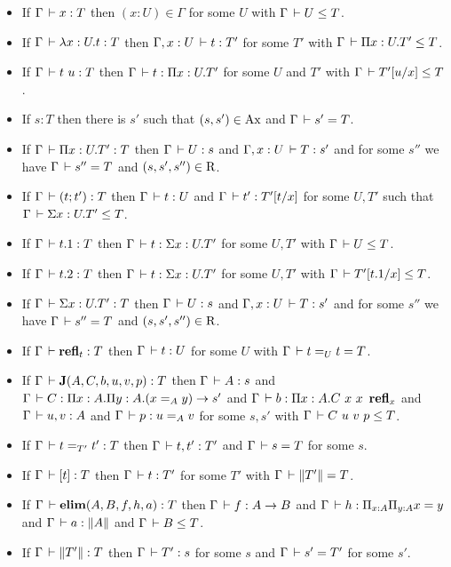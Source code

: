 \documentclass[a4paper,english]{lipics-utf8x}
\begin{document}
  \begin{lemma}[Inversion]
    \label{lem:inversion}
    \leavevmode
    \begin{itemize}
      \item If $\Gamma \,\vdash x : T$ then $(x:U) \in \Gamma$ for some
      $U$ with $\Gamma \,\vdash U \le T$.
      \item If $\Gamma \,\vdash \lambda x:U.t : T$ then $\Gamma, x:U \,\vdash t : T'$
      for some $T'$ with $\Gamma \,\vdash \Pi x:U.T' \le T$.
      \item If $\Gamma \,\vdash t\ u : T$ then $\Gamma \,\vdash t : \Pi x:U.T'$
      for some $U$ and $T'$ with $\Gamma \,\vdash T'[u/x] \le T$.
      \item If $s : T$ then there is $s'$ such that $(s,s') \in \operatorname{Ax}$
      and $\Gamma \,\vdash s' = T$.
      \item If $\Gamma \,\vdash \Pi x:U.T' : T$ then $\Gamma \,\vdash U : s$
      and $\Gamma, x:U \,\vdash T : s'$ and for some $s''$ we have
      $\Gamma \,\vdash s'' = T$ and $(s,s',s'') \in \operatorname{R}$.
      \item If $\Gamma \,\vdash (t ; t') : T$ then $\Gamma \,\vdash t : U$ and
      $\Gamma \,\vdash t' : T'[t/x]$ for some $U,T'$ such that
      $\Gamma \,\vdash \Sigma x:U.T' \le T$.
      \item If $\Gamma \,\vdash t.1 : T$ then $\Gamma \,\vdash t : \Sigma x:U.T'$
      for some $U,T'$ with $\Gamma \,\vdash U \le T$.
      \item If $\Gamma \,\vdash t.2 : T$ then $\Gamma \,\vdash t : \Sigma x:U.T'$
      for some $U,T'$ with $\Gamma \,\vdash T'[t.1/x] \le T$.
      \item If $\Gamma \,\vdash \Sigma x:U.T' : T$ then $\Gamma \,\vdash U : s$
      and $\Gamma, x:U \,\vdash T : s'$ and for some $s''$ we have
      $\Gamma \,\vdash s'' = T$ and $(s,s',s'') \in \operatorname{R}$.
      \item If $\Gamma \,\vdash \operatorname{\mathbf{refl}}_t : T$ then $\Gamma \,\vdash t : U$
      for some $U$ with $\Gamma \,\vdash t =_U t = T$.
      \item If $\Gamma \,\vdash \operatorname{\mathbf{J}}(A,C,b,u,v,p) : T$ then $\Gamma \,\vdash A : s$
      and $\Gamma \,\vdash C : \Pi x:A. \Pi y:A. (x =_A y) \to s'$ and
      $\Gamma \,\vdash b : \Pi x:A. C\ x\ x\ \operatorname{\mathbf{refl}}_x$ and $\Gamma \,\vdash u, v : A$
      and $\Gamma \,\vdash p : u =_A v$ for some $s,s'$ with
      $\Gamma \,\vdash C\ u\ v\ p \le T$.
      \item If $\Gamma \,\vdash t =_{T'} t' : T$ then $\Gamma \,\vdash t,t' : T'$
      and $\Gamma \,\vdash s = T$ for some $s$.
      \item If $\Gamma \,\vdash [t] : T$ then $\Gamma \,\vdash t : T'$ for some
      $T'$ with $\Gamma \,\vdash \|T'\| = T$.
      \item If $\Gamma \,\vdash \operatorname{\mathbf{elim}}(A,B,f,h,a) : T$ then
      $\Gamma \,\vdash f : A \to B$ and $\Gamma \,\vdash h : \Pi_{x:A} \Pi_{y:A} x = y$
      and $\Gamma \,\vdash a : \|A\|$ and $\Gamma \,\vdash B \le T$.
      \item If $\Gamma \,\vdash \|T'\| : T$ then $\Gamma \,\vdash T' : s$ for
      some $s$ and $\Gamma \,\vdash s' = T'$ for some $s'$.
    \end{itemize}
  \end{lemma}
\end{document}
